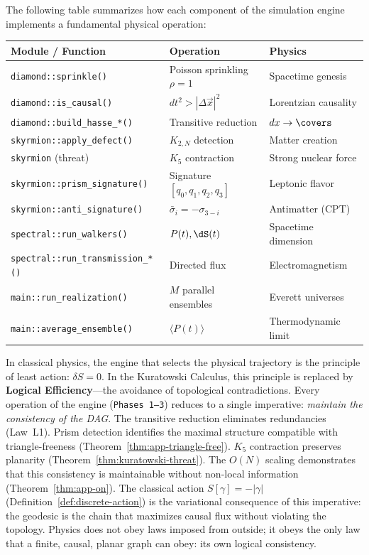 \noindent
The following table summarizes how each component of the simulation
engine implements a fundamental physical operation:

\medskip
\begin{center}
\small
\begin{tabular}{p{4.5cm}ll}
\toprule
\textbf{Module / Function} & \textbf{Operation} &
  \textbf{Physics} \\
\midrule
\texttt{diamond::sprinkle()}
  & Poisson sprinkling $\rho = 1$
  & Spacetime genesis \\
\texttt{diamond::is\_causal()}
  & $dt^2 > |\Delta\vec{x}|^2$
  & Lorentzian causality \\
\texttt{diamond::build\_hasse\_*()}
  & Transitive reduction
  & $dx \to \covers$ \\
\texttt{skyrmion::apply\_defect()}
  & $K_{2,N}$ detection
  & Matter creation \\
\texttt{skyrmion} (threat)
  & $K_5$ contraction
  & Strong nuclear force \\
\texttt{skyrmion::prism\_signature()}
  & Signature $[q_0,q_1,q_2,q_3]$
  & Leptonic flavor \\
\texttt{skyrmion::anti\_signature()}
  & $\bar{\sigma}_i = -\sigma_{3-i}$
  & Antimatter (CPT) \\
\texttt{spectral::run\_walkers()}
  & $P(t), \dS(t)$
  & Spacetime dimension \\
\texttt{spectral::run\_transmission\_*()}
  & Directed flux
  & Electromagnetism \\
\texttt{main::run\_realization()}
  & $M$ parallel ensembles
  & Everett universes \\
\texttt{main::average\_ensemble()}
  & $\langle P(t)\rangle$
  & Thermodynamic limit \\
\bottomrule
\end{tabular}
\end{center}

\bigskip\noindent
\begin{result}[title={Logical Efficiency as the Engine of
Physics}]
\label{res:logical-efficiency}
In classical physics, the engine that selects the physical
trajectory is the principle of least action: $\delta S = 0$.
In the Kuratowski Calculus, this principle is replaced by
\textbf{Logical Efficiency}---the avoidance of topological
contradictions. Every operation of the engine (\texttt{Phases 1--3})
reduces to a single imperative: \emph{maintain the consistency
of the DAG}. The transitive reduction eliminates redundancies (Law~L1).
Prism detection identifies the maximal structure
compatible with triangle-freeness
(Theorem~\ref{thm:app-triangle-free}). $K_5$ contraction
preserves planarity (Theorem~\ref{thm:kuratowski-threat}). The
$O(N)$ scaling demonstrates that this consistency is maintainable
without non-local information
(Theorem~\ref{thm:app-on}). The classical action $S[\gamma]
= -|\gamma|$ (Definition~\ref{def:discrete-action}) is the
variational consequence of this imperative: the geodesic is the
chain that maximizes causal flux without violating the topology. Physics
does not obey laws imposed from outside; it obeys the
only law that a finite, causal, planar graph can obey:
its own logical consistency.
\end{result}

